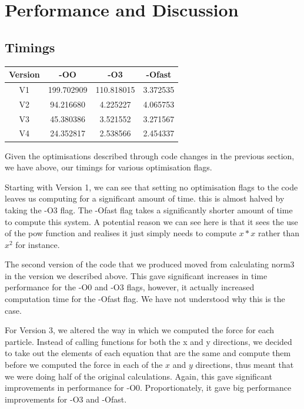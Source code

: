 \section{Performance and Discussion}
\subsection{Timings}
\begin{center}
  \begin{tabular}{|c|c|c|c|}
    \hline
    Version & -OO & -O3 & -Ofast\\
    \hline
    V1 & 199.702909 & 110.818015 & 3.372535\\
    V2 & 94.216680 & 4.225227 & 4.065753\\
    V3 & 45.380386 & 3.521552 & 3.271567\\
    V4 & 24.352817 & 2.538566 & 2.454337\\
    \hline
  \end{tabular}
\end{center}
Given the optimisations described through code changes in the previous section, we have above, our timings for various optimisation flags.

Starting with Version 1, we can see that setting no optimisation flags to the code leaves us computing for a significant amount of time. this is almost halved by taking the -O3 flag. The -Ofast flag takes a significantly shorter amount of time to compute this system. A potential reason we can see here is that it sees the use of the pow function and realises it just simply needs to compute $x*x$ rather than $x^2$ for instance.

The second version of the code that we produced moved from calculating norm3 in the version we described above. This gave significant increases in time performance for the -O0 and -O3 flags, however, it actually increased computation time for the -Ofast flag. We have not understood why this is the case.

For Version 3, we altered the way in which we computed the force for each particle. Instead of calling functions for both the x and y directions, we decided to take out the elements of each equation that are the same and compute them before we computed the force in each of the $x$ and $y$ directions, thus meant that we were doing half of the original calculations. Again, this gave significant improvements in performance for -O0. Proportionately, it gave big performance improvements for -O3 and -Ofast.

